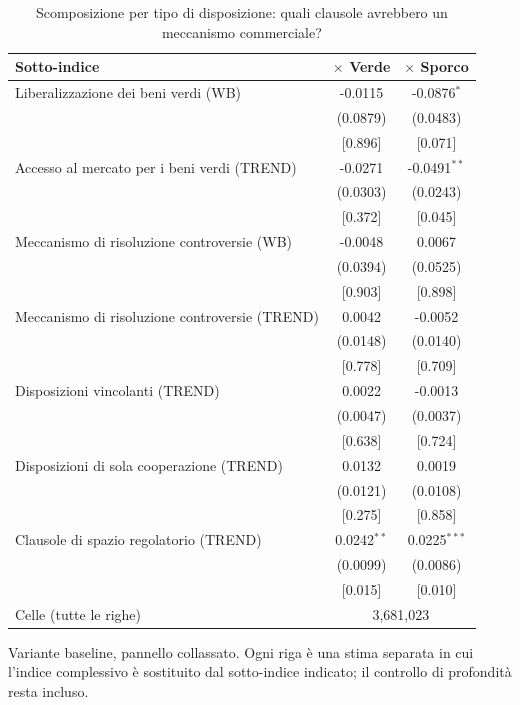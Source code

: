 \begin{table}[htbp]
\centering
\footnotesize
\caption{Scomposizione per tipo di disposizione: quali clausole avrebbero un meccanismo commerciale?}
\label{tab:subindices}
\begin{threeparttable}
\begin{tabular}{lcc}
\toprule
Sotto-indice & $\times$ Verde & $\times$ Sporco \\
\midrule
Liberalizzazione dei beni verdi (WB) & -0.0115 & -0.0876$^{*}$ \\
 & (0.0879) & (0.0483) \\
 & [0.896] & [0.071] \\
\addlinespace
Accesso al mercato per i beni verdi (TREND) & -0.0271 & -0.0491$^{**}$ \\
 & (0.0303) & (0.0243) \\
 & [0.372] & [0.045] \\
\addlinespace
Meccanismo di risoluzione controversie (WB) & -0.0048 & 0.0067 \\
 & (0.0394) & (0.0525) \\
 & [0.903] & [0.898] \\
\addlinespace
Meccanismo di risoluzione controversie (TREND) & 0.0042 & -0.0052 \\
 & (0.0148) & (0.0140) \\
 & [0.778] & [0.709] \\
\addlinespace
Disposizioni vincolanti (TREND) & 0.0022 & -0.0013 \\
 & (0.0047) & (0.0037) \\
 & [0.638] & [0.724] \\
\addlinespace
Disposizioni di sola cooperazione (TREND) & 0.0132 & 0.0019 \\
 & (0.0121) & (0.0108) \\
 & [0.275] & [0.858] \\
\addlinespace
Clausole di spazio regolatorio (TREND) & 0.0242$^{**}$ & 0.0225$^{***}$ \\
 & (0.0099) & (0.0086) \\
 & [0.015] & [0.010] \\
\addlinespace
\midrule
Celle (tutte le righe) & \multicolumn{2}{c}{3,681,023} \\
\bottomrule
\end{tabular}
\begin{tablenotes}[flushleft]\footnotesize
\item Variante baseline, pannello collassato. Ogni riga \`e una stima separata in cui l'indice complessivo \`e sostituito dal sotto-indice indicato; il controllo di profondit\`a resta incluso.

\end{tablenotes}
\end{threeparttable}
\end{table}
